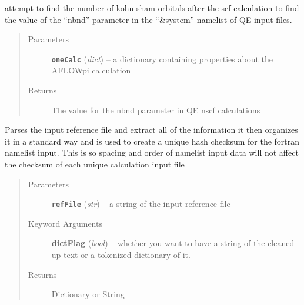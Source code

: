 \documentclass[letterpaper,10pt,english]{sphinxmanual}
\begin{document}
\begin{fulllineitems}
\label{prep:prep.__num_bands}
attempt to find the number of kohn-sham orbitals after the scf calculation to find
the value of the ``nbnd'' parameter in the ``\&system'' namelist of QE input files.
\begin{quote}\begin{description}
\item[{Parameters}] \leavevmode
\textbf{\texttt{oneCalc}} (\emph{dict}) -- a dictionary containing properties about the AFLOWpi calculation

\item[{Returns}] \leavevmode
The value for the nbnd parameter in QE nscf calculations

\end{description}\end{quote}

\end{fulllineitems}


\begin{fulllineitems}
\label{prep:prep.__parseRef}
Parses the input reference file and extract all of the information
it then organizes it in a standard way and is used to create a
unique hash checksum for the fortran namelist input. This is so spacing
and order of namelist input data will not affect the checksum of each
unique calculation input file
\begin{quote}\begin{description}
\item[{Parameters}] \leavevmode
\textbf{\texttt{refFile}} (\emph{str}) -- a string of the input reference file

\item[{Keyword Arguments}] \leavevmode
\textbf{dictFlag} (\emph{bool}) --
whether you want to have a string of the cleaned up text or a
tokenized dictionary of it.

\item[{Returns}] \leavevmode
Dictionary or String

\end{description}\end{quote}

\end{fulllineitems}
\end{document}
